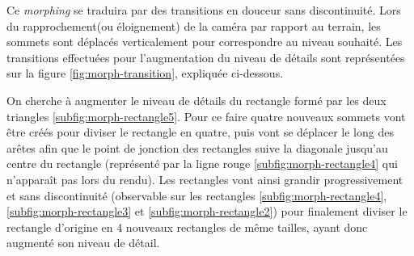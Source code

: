   Ce \emph{morphing} se traduira par des transitions en douceur sans discontinuité. Lors du rapprochement(ou éloignement) de la caméra par rapport au terrain, les sommets sont déplacés verticalement pour correspondre au niveau souhaité. Les transitions effectuées pour l'augmentation du niveau de détails sont représentées sur la figure \ref{fig:morph-transition}, expliquée ci-dessous. 
  
  On cherche à augmenter le niveau de détails du rectangle formé par les deux triangles \ref{subfig:morph-rectangle5}. Pour ce faire quatre nouveaux sommets vont être créés pour diviser le rectangle en quatre, puis vont se déplacer le long des arêtes afin que le point de jonction des rectangles suive la diagonale jusqu'au centre du rectangle (représenté par la ligne rouge \ref{subfig:morph-rectangle4} qui n'apparaît pas lors du rendu). Les rectangles vont ainsi grandir progressivement et sans discontinuité (observable sur les rectangles \ref{subfig:morph-rectangle4}, \ref{subfig:morph-rectangle3} et \ref{subfig:morph-rectangle2}) pour finalement diviser le rectangle d'origine en 4 nouveaux rectangles de même tailles, ayant donc augmenté son niveau de détail.
  
